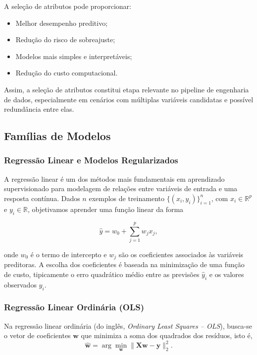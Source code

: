 A seleção de atributos pode proporcionar:

\begin{itemize}
    \item Melhor desempenho preditivo;
    \item Redução do risco de sobreajuste;
    \item Modelos mais simples e interpretáveis;
    \item Redução do custo computacional.
\end{itemize}

Assim, a seleção de atributos constitui etapa relevante no pipeline de engenharia de dados, especialmente em cenários com múltiplas variáveis candidatas e possível redundância entre elas.

\subsection{Famílias de Modelos}
\subsubsection{Regressão Linear e Modelos Regularizados}

A regressão linear é um dos métodos mais fundamentais em aprendizado supervisionado para modelagem de relações entre variáveis de entrada e uma resposta contínua. Dados \(n\) exemplos de treinamento \(\{(x_i, y_i)\}_{i=1}^n\), com \(x_i \in \mathbb{R}^p\) e \(y_i \in \mathbb{R}\), objetivamos aprender uma função linear da forma

\begin{equation}
\hat{y} = w_0 + \sum_{j=1}^{p} w_j x_j,
\end{equation}

onde \(w_0\) é o termo de intercepto e \(w_j\) são os coeficientes associados às variáveis preditoras. A escolha dos coeficientes é baseada na minimização de uma função de custo, tipicamente o erro quadrático médio entre as previsões \(\hat{y}_i\) e os valores observados \(y_i\).

\subsubsection{Regressão Linear Ordinária (OLS)}

Na regressão linear ordinária (do inglês, \textit{Ordinary Least Squares -- OLS}), busca-se o vetor de coeficientes
\(\mathbf{w}\) que minimiza a soma dos quadrados dos resíduos, isto é,
\begin{equation}
\hat{\mathbf{w}}
=
\arg\min_{\mathbf{w}}
\|\mathbf{X}\mathbf{w} - \mathbf{y}\|_2^2.
\end{equation}

